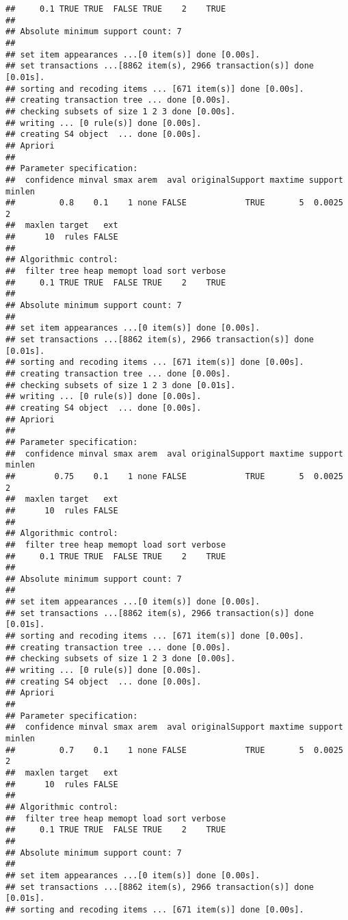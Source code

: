 \documentclass[]{article}
\begin{document}
\begin{verbatim}
##     0.1 TRUE TRUE  FALSE TRUE    2    TRUE
## 
## Absolute minimum support count: 7 
## 
## set item appearances ...[0 item(s)] done [0.00s].
## set transactions ...[8862 item(s), 2966 transaction(s)] done [0.01s].
## sorting and recoding items ... [671 item(s)] done [0.00s].
## creating transaction tree ... done [0.00s].
## checking subsets of size 1 2 3 done [0.00s].
## writing ... [0 rule(s)] done [0.00s].
## creating S4 object  ... done [0.00s].
## Apriori
## 
## Parameter specification:
##  confidence minval smax arem  aval originalSupport maxtime support minlen
##         0.8    0.1    1 none FALSE            TRUE       5  0.0025      2
##  maxlen target   ext
##      10  rules FALSE
## 
## Algorithmic control:
##  filter tree heap memopt load sort verbose
##     0.1 TRUE TRUE  FALSE TRUE    2    TRUE
## 
## Absolute minimum support count: 7 
## 
## set item appearances ...[0 item(s)] done [0.00s].
## set transactions ...[8862 item(s), 2966 transaction(s)] done [0.01s].
## sorting and recoding items ... [671 item(s)] done [0.00s].
## creating transaction tree ... done [0.00s].
## checking subsets of size 1 2 3 done [0.01s].
## writing ... [0 rule(s)] done [0.00s].
## creating S4 object  ... done [0.00s].
## Apriori
## 
## Parameter specification:
##  confidence minval smax arem  aval originalSupport maxtime support minlen
##        0.75    0.1    1 none FALSE            TRUE       5  0.0025      2
##  maxlen target   ext
##      10  rules FALSE
## 
## Algorithmic control:
##  filter tree heap memopt load sort verbose
##     0.1 TRUE TRUE  FALSE TRUE    2    TRUE
## 
## Absolute minimum support count: 7 
## 
## set item appearances ...[0 item(s)] done [0.00s].
## set transactions ...[8862 item(s), 2966 transaction(s)] done [0.01s].
## sorting and recoding items ... [671 item(s)] done [0.00s].
## creating transaction tree ... done [0.00s].
## checking subsets of size 1 2 3 done [0.00s].
## writing ... [0 rule(s)] done [0.00s].
## creating S4 object  ... done [0.00s].
## Apriori
## 
## Parameter specification:
##  confidence minval smax arem  aval originalSupport maxtime support minlen
##         0.7    0.1    1 none FALSE            TRUE       5  0.0025      2
##  maxlen target   ext
##      10  rules FALSE
## 
## Algorithmic control:
##  filter tree heap memopt load sort verbose
##     0.1 TRUE TRUE  FALSE TRUE    2    TRUE
## 
## Absolute minimum support count: 7 
## 
## set item appearances ...[0 item(s)] done [0.00s].
## set transactions ...[8862 item(s), 2966 transaction(s)] done [0.01s].
## sorting and recoding items ... [671 item(s)] done [0.00s].

\end{verbatim}
\end{document}

